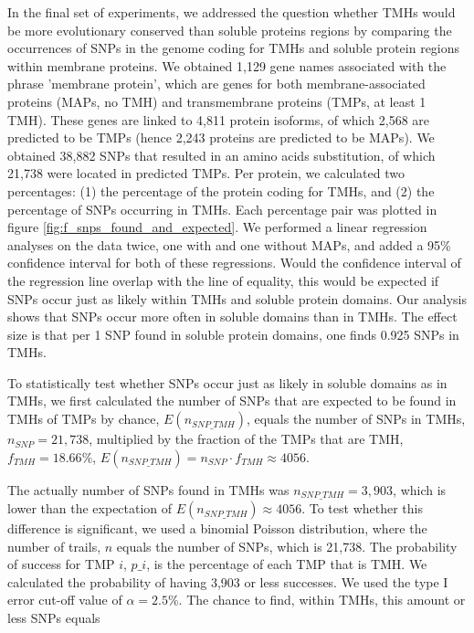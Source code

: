 In the final set of experiments, 
we addressed the question whether TMHs 
would be more evolutionary conserved than soluble proteins regions 
by comparing the occurrences of SNPs in the genome coding 
for TMHs and soluble protein regions within membrane proteins. 
We obtained 1,129 gene names associated with the phrase 'membrane protein',
which are genes for both membrane-associated proteins (MAPs, no TMH) and 
transmembrane proteins (TMPs, at least 1 TMH).
These genes are linked to 4,811 protein isoforms, 
of which 2,568 are predicted to be TMPs (hence 
2,243 proteins are predicted to be MAPs).
We obtained 38,882 SNPs that resulted in an
amino acids substitution, of which 21,738 were located 
in predicted TMPs.
Per protein, we calculated two percentages: 
(1) the percentage of the protein coding for TMHs, 
and (2) the percentage of SNPs occurring in TMHs.
Each percentage pair was plotted in figure \ref{fig:f_snps_found_and_expected}.
We performed a linear regression analyses on the data twice,
one with and one without MAPs,
and added a 95\% confidence interval for both of these regressions.
Would the confidence interval of the regression line 
overlap with the line of equality,
this would be expected if SNPs occur just as likely within TMHs and soluble protein domains.
Our analysis shows that SNPs occur more often in soluble domains
than in TMHs.
The effect size is that per 1 SNP found in soluble protein
domains, one finds 0.925 SNPs in TMHs.

To statistically test whether SNPs occur 
just as likely in soluble domains as
in TMHs, we first calculated the number of SNPs that are expected to be
found in TMHs of TMPs by chance, $E(n_{SNP\_TMH})$,
equals the number of SNPs in TMHs, $n_{SNP} = 21,738$, 
multiplied by the fraction of the TMPs that are TMH, $f_{TMH} = 18.66\%$,
$E(n_{SNP\_TMH}) = n_{SNP} \cdot f_{TMH} \approx 4056$.

The actually number of SNPs found in TMHs
was $n_{SNP\_TMH} = 3,903$, which is lower than the expectation
of $E(n_{SNP\_TMH}) \approx 4056$.
To test whether this difference is significant,
we used a binomial Poisson distribution, where the number of trails,
$n$ equals the number of SNPs, which is 21,738. The probability of success
for TMP $i$, $p\_i$, is the percentage of each TMP that is TMH.
We calculated the probability of having 3,903 or less successes.
We used the type I error cut-off value of $\alpha = 2.5\%$.
The chance to find, within TMHs, this amount or less SNPs 
equals 

